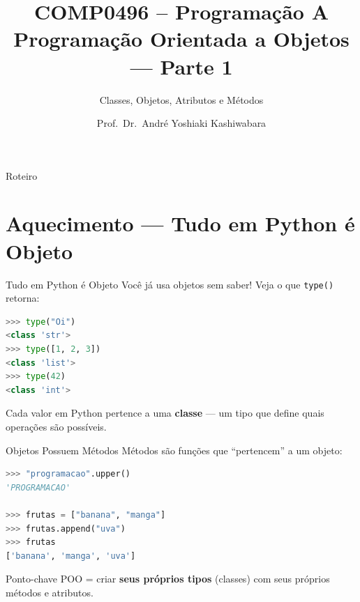 \documentclass[aspectratio=169]{beamer}
\title{COMP0496 -- Programação A \\ Programação Orientada a Objetos --- Parte 1}
\subtitle{Classes, Objetos, Atributos e Métodos}
\author{Prof.\ Dr.\ André Yoshiaki Kashiwabara}
\institute{DCOMP -- Universidade Federal de Sergipe\\
\texttt{andreyoshiaki@dcomp.ufs.br}}
\date{}
\begin{document}
\begin{frame}
  \titlepage
\end{frame}

\begin{frame}{Roteiro}
  \tableofcontents
\end{frame}

\section{Aquecimento --- Tudo em Python é Objeto}

\begin{frame}[fragile]{Tudo em Python é Objeto}
  Você já usa objetos sem saber! Veja o que \texttt{type()} retorna:

  \begin{lstlisting}[language=Python]
>>> type("Oi")
<class 'str'>
>>> type([1, 2, 3])
<class 'list'>
>>> type(42)
<class 'int'>
  \end{lstlisting}

  \vspace{0.3cm}
  Cada valor em Python pertence a uma \textbf{classe} --- um tipo que define
  quais operações são possíveis.
\end{frame}

\begin{frame}[fragile]{Objetos Possuem Métodos}
  Métodos são funções que ``pertencem'' a um objeto:

  \begin{lstlisting}[language=Python]
>>> "programacao".upper()
'PROGRAMACAO'

>>> frutas = ["banana", "manga"]
>>> frutas.append("uva")
>>> frutas
['banana', 'manga', 'uva']
  \end{lstlisting}

  \vspace{0.3cm}
  \begin{block}{Ponto-chave}
    POO = criar \textbf{seus próprios tipos} (classes)
    com seus próprios métodos e atributos.
  \end{block}
\end{frame}
\end{document}
